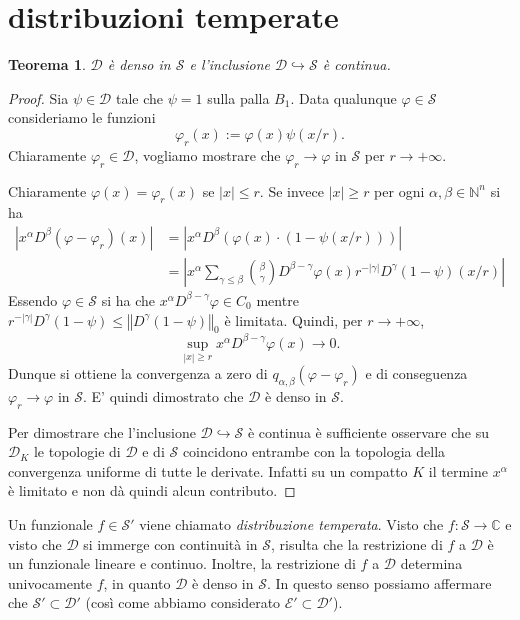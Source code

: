 \documentclass[italian,a4paper,oneside,headinclude]{scrbook}
\renewcommand{\phi}{\varphi}
\newcommand{\D}{\mathcal D}
\newcommand{\E}{\mathcal E}
\renewcommand{\S}{\mathcal S}
\newcommand{\CC}{\mathbb C}
\newcommand{\NN}{\mathbb N}
\newcommand{\abs}[1]{{\left|#1\right|}}
\newcommand{\Abs}[1]{{\left\Vert #1\right\Vert}}
\newcommand{\defeq}{:=}
\newtheorem{theorem}{Teorema}
\begin{document}
\section{distribuzioni temperate}
\begin{theorem}
  $\D$ è denso in $\S$ e l'inclusione $\D\hookrightarrow \S$ è continua.
\end{theorem}
%
\begin{proof}
  Sia $\psi\in\D$ tale che $\psi=1$ sulla palla $B_1$.
  Data qualunque $\phi\in\S$ consideriamo le funzioni
  \[
  \phi_r(x) \defeq \phi(x) \psi(x/r).
  \]
  Chiaramente $\phi_r \in\D$, vogliamo mostrare che $\phi_r \to \phi$
  in $\S$ per $r\to +\infty$.

  Chiaramente $\phi(x)=\phi_r(x)$ se $\abs{x}\le r$.
  Se invece $\abs{x}\ge r$
  per ogni $\alpha,\beta \in\NN^n$ si ha
  \begin{align*}
    \abs{x^\alpha D^\beta (\phi-\phi_r)(x)}
    &= \abs{x^\alpha D^\beta (\phi(x)\cdot (1-\psi(x/r)))}\\
    &= \abs{x^\alpha \sum_{\gamma\le \beta}{\beta \choose \gamma}
      D^{\beta-\gamma} \phi(x) r^{-\abs{\gamma}}D^\gamma (1-\psi)(x/r)}
  \end{align*}
  Essendo $\phi\in\S$ si ha che
  $x^\alpha D^{\beta-\gamma}\phi\in C_0$
  mentre $r^{-\abs{\gamma}} D^\gamma(1-\psi)\le \Abs{D^\gamma(1-\psi)}_0$ è limitata.
  Quindi,
  per $r\to +\infty$,
  \[
  \sup_{\abs{x}\ge r} x^\alpha D^{\beta-\gamma}\phi(x)\to 0.
  \]
  Dunque si ottiene la convergenza a zero di
  $q_{\alpha,\beta}(\phi-\phi_r)$
  e di conseguenza $\phi_r\to\phi$ in $\S$.
  E' quindi dimostrato che $\D$ è denso in $\S$.

  Per dimostrare che l'inclusione $\D\hookrightarrow\S$ è continua è
  sufficiente osservare che su $\D_K$ le topologie di $\D$ e di $\S$
  coincidono entrambe con la topologia della convergenza uniforme di
  tutte le derivate. Infatti su un compatto $K$ il termine $x^\alpha$
  è limitato e non dà quindi alcun contributo.
\end{proof}

Un funzionale $f\in \S'$ viene chiamato
\emph{distribuzione temperata}.
\marginpar{$\S'$}
Visto che $f\colon \S\to \CC$ e visto che $\D$ si immerge con
continuità in $\S$, risulta che la restrizione di $f$ a  $\D$ è un
funzionale lineare e continuo. Inoltre, la restrizione di $f$ a $\D$
determina univocamente $f$, in quanto $\D$ è denso in $\S$.
In questo senso possiamo affermare che $\S'\subset \D'$ (così come
abbiamo considerato $\E'\subset \D'$).
\end{document}
